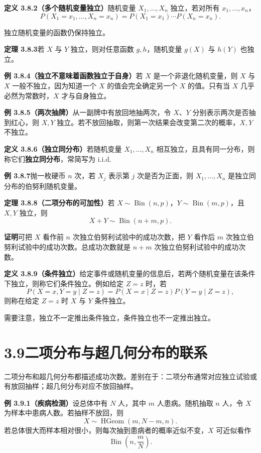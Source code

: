 \documentclass[UTF8,12pt,a4paper,fontset=fandol]{ctexart}
\begin{document}
\noindent\textbf{定义 3.8.2（多个随机变量独立）}\quad 随机变量 $X_1,\ldots,X_n$ 独立，若对所有 $x_1,\ldots,x_n$，
\[
  P(X_1=x_1,\ldots,X_n=x_n)
  =P(X_1=x_1)\cdots P(X_n=x_n).
\]

独立随机变量的函数仍保持独立。

\noindent\textbf{定理 3.8.3}\quad 若 $X$ 与 $Y$ 独立，则对任意函数 $g,h$，随机变量 $g(X)$ 与 $h(Y)$ 也独立。

\noindent\textbf{例 3.8.4（独立不意味着函数独立于自身）}\quad 若 $X$ 是一个非退化随机变量，则 $X$ 与 $X$ 一般不独立，因为知道一个 $X$ 的值会完全确定另一个 $X$ 的值。只有当 $X$ 几乎必然为常数时，$X$ 才与自身独立。

\noindent\textbf{例 3.8.5（两次抽牌）}\quad 从一副牌中有放回地抽两次，令 $X$、$Y$ 分别表示两次是否抽到红心，则 $X,Y$ 独立。若不放回抽取，则第一次结果会改变第二次的概率，$X,Y$ 不独立。

\noindent\textbf{定义 3.8.6（独立同分布）}\quad 若随机变量 $X_1,\ldots,X_n$ 相互独立，且具有同一分布，则称它们\textbf{独立同分布}，常简写为 i.i.d.

\noindent\textbf{例 3.8.7}\quad 抛一枚硬币 $n$ 次，若 $X_j$ 表示第 $j$ 次是否为正面，则 $X_1,\ldots,X_n$ 是独立同分布的伯努利随机变量。

\noindent\textbf{定理 3.8.8（二项分布的可加性）}\quad 若 $X\sim\operatorname{Bin}(n,p)$，$Y\sim\operatorname{Bin}(m,p)$，且 $X,Y$ 独立，则
\[
  X+Y\sim\operatorname{Bin}(n+m,p).
\]

\noindent\textbf{证明}\quad 可把 $X$ 看作前 $n$ 次独立伯努利试验中的成功次数，把 $Y$ 看作后 $m$ 次独立伯努利试验中的成功次数。总成功次数就是 $n+m$ 次独立伯努利试验中的成功次数。

\noindent\textbf{定义 3.8.9（条件独立）}\quad 给定事件或随机变量的信息后，若两个随机变量在该条件下独立，则称它们条件独立。例如给定 $Z=z$ 时，若
\[
  P(X=x,Y=y\mid Z=z)=P(X=x\mid Z=z)P(Y=y\mid Z=z),
\]
则称在给定 $Z=z$ 时 $X$ 与 $Y$ 条件独立。

需要注意，独立不一定推出条件独立，条件独立也不一定推出独立。

\section*{3.9\quad 二项分布与超几何分布的联系}

二项分布和超几何分布都描述成功次数。差别在于：二项分布通常对应独立试验或有放回抽样；超几何分布对应不放回抽样。

\noindent\textbf{例 3.9.1（疾病检测）}\quad 设总体中有 $N$ 人，其中 $m$ 人患病。随机抽取 $n$ 人，令 $X$ 为样本中患病人数。若抽样不放回，则
\[
  X\sim\operatorname{HGeom}(m,N-m,n).
\]
若总体很大而样本相对很小，则每次抽到患病者的概率近似不变，$X$ 可近似看作
\[
  \operatorname{Bin}\left(n,\frac{m}{N}\right).
\]
\end{document}
